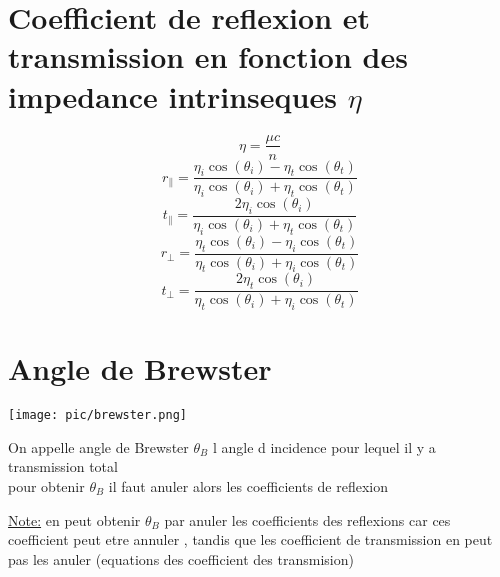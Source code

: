 \documentclass[12pt]{book}
\begin{document}
        \section{Coefficient de reflexion et transmission en fonction des impedance intrinseques $\eta$}
            \[\eta = \frac{\mu c}{n}\]
            \[ r_\parallel = \frac{\eta_i \cos(\theta_i)-\eta_t\cos(\theta_t)}{\eta_i \cos(\theta_i)+\eta_t\cos(\theta_t)}\]
            \[ t_\parallel = \frac{2\eta_i \cos(\theta_i)}{\eta_i \cos(\theta_i)+\eta_t\cos(\theta_t)}\]
            \[ r_\perp = \frac{\eta_t \cos(\theta_i)-\eta_i\cos(\theta_t)}{\eta_t \cos(\theta_i)+\eta_i\cos(\theta_t)}\]
            \[ t_\perp = \frac{2\eta_t \cos(\theta_i)}{\eta_t \cos(\theta_i)+\eta_i\cos(\theta_t)}\]
        \section{Angle de Brewster }
            \begin{center}
                \texttt{[image: pic/brewster.png]}
            \end{center}
            On appelle angle de Brewster $\theta_B$ l angle d incidence pour lequel il y a transmission total \\
            pour obtenir $\theta_B$ il faut anuler alors les coefficients de reflexion \\
            \begin{center}
            \end{center}
            \begin{center}
                \underline{Note:} en peut obtenir $\theta_B$ par anuler les coefficients des reflexions car ces coefficient peut etre annuler , tandis que les coefficient de transmission en peut pas les anuler (equations des coefficient des transmision)
            \end{center}
\end{document}
